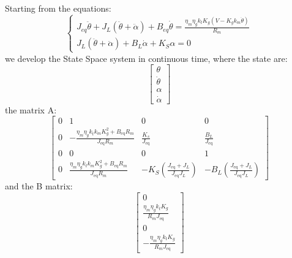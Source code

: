                 Starting from the equations:
                \begin{equation*}
                    \begin{cases}
                        J_{eq}\ddot\theta+J_{L}(\ddot\theta+\ddot\alpha) + B_{eq}\dot\theta=\frac{\eta_m\eta_g k_t K_g(V - K_g k_m\dot\theta)}{R_m} \\
                        J_{L}(\ddot\theta+\ddot\alpha)+B_L\dot\alpha +K_{S}\alpha=0
                    \end{cases}
                \end{equation*}
                we develop the State Space system in continuous time, where the state are:
                \[
                    \left\lbrack \begin{array}{c}
                        \theta \\
                        \dot{\theta} \\
                        \alpha \\
                        \dot{\alpha} 
                        \end{array}\right\rbrack\]
                the matrix A:
                \begin{equation*}
                    \left\lbrack \begin{array}{cccc}
                        0 & 1 & 0 & 0\\
                        0 & -\frac{\eta_m \eta_g k_t k_m K_g^2 +B_{\mathrm{eq}} R_m }{J_{\mathrm{eq}} R_m } & \frac{K_s }{J_{\mathrm{eq}} } & \frac{B_L }{J_{\mathrm{eq}} }\\
                        0 & 0 & 0 & 1\\
                        0 & \frac{\eta_m \eta_g k_t k_m K_g^2 +B_{\mathrm{eq}} R_m }{J_{\mathrm{eq}} R_m } & -K_S \left(\frac{J_{\mathrm{eq}} +J_{L} }{J_{\mathrm{eq}} J_{L} }\right) & -B_L \left(\frac{J_{\mathrm{eq}} +J_{L} }{J_{\mathrm{eq}} J_{L} }\right)
                        \end{array}\right\rbrack 
                \end{equation*}
                and the B matrix:
                \begin{equation*}
                    \left\lbrack \begin{array}{c}
                        0\\
                        \frac{\eta_m \eta_g k_t K_g }{R_m J_{\mathrm{eq}} }\\
                        0\\
                        -\frac{\eta_m \eta_g k_t K_g }{R_m J_{\mathrm{eq}} }
                        \end{array}\right\rbrack
                \end{equation*}

